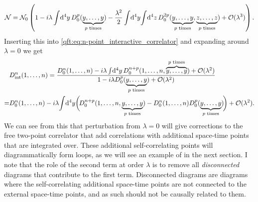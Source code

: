 \documentclass[../main.tex]{subfiles}
\begin{document}
\begin{equation}
  \mathcal{N} = \mathcal{N}_0 \left(1 - i\lambda \int \!\mathrm{d}^4y\, D_0^p(\underbrace{y, \ldots, y}_{p\text{ times}}) - \frac{\lambda^2}{2} \int \!\mathrm{d}^4y\,\!\! \int \!\mathrm{d}^4z\, D_0^{2p}(\underbrace{y,\ldots,y}_{p\text{ times}}, \underbrace{z,\ldots,z}_{p\text{ times}}) + \mathcal{O}(\lambda^3)\right).
\end{equation}
Inserting this into \cref{qft:eq:n-point_interactive_correlator} and expanding around \(\lambda = 0\) we get
\begin{align}
  \label{qft:eq:n-point_interacting_correlator}
  \nonumber
    & D^n_\text{int}(1,\ldots, n) = \frac{D_0^n(1, \ldots, n) - i\lambda \int \!\mathrm{d}^4y\, D_0^{n+p}(1, \ldots, n, \overbrace{y, \ldots, y}^{p\text{ times}}) + \mathcal{O}(\lambda^2)}{1 - i\lambda D_0^p(\underbrace{y, \ldots, y}_{p\text{ times}}) + \mathcal{O}(\lambda^2)} \\
  = & D^n_0(1,\ldots,n) - i\lambda\! \int \!\mathrm{d}^4y\,\! \biggl(\!D_0^{n+p}(1, \ldots, n, \underbrace{y, \ldots, y}_{p\text{ times}}) - D_0^n(1, \ldots, n) D_0^p(\underbrace{y, \ldots, y}_{p\text{ times}})\!\biggr) + \mathcal{O}(\lambda^2).
\end{align}
We can see from this that perturbation from \(\lambda = 0\) will give corrections to the free two-point correlator that add correlations with additional space-time points that are integrated over.
These additional self-correlating points will diagrammatically form loops, as we will see an example of in the next section.
I note that the role of the second term at order \(\lambda\) is to remove all \emph{disconnected} diagrams that contribute to the first term.
Disconnected diagrams are diagrams where the self-correlating additional space-time points are not connected to the external space-time points, and as such should not be causally related to them.
\end{document}
